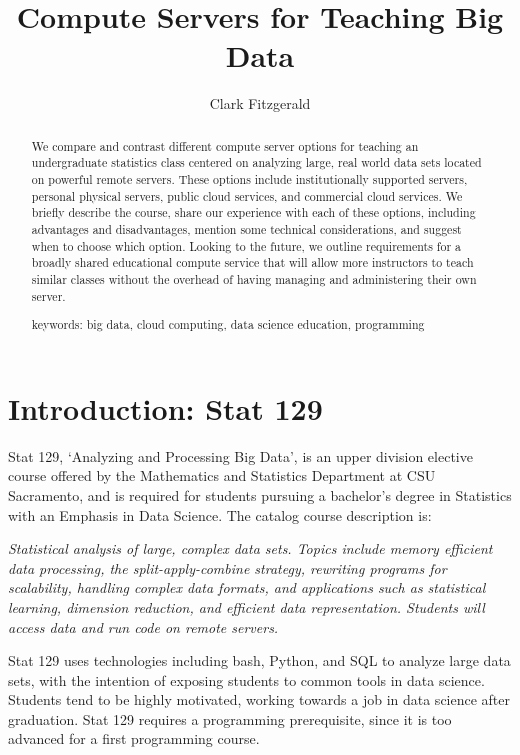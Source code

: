 \documentclass[12pt]{article}
\title{Compute Servers for Teaching Big Data}
\author{Clark Fitzgerald}
\begin{document}
\maketitle

\begin{abstract}

    We compare and contrast different compute server options for teaching an undergraduate statistics class centered on analyzing large, real world data sets located on powerful remote servers.
These options include institutionally supported servers, personal physical servers, public cloud services, and commercial cloud services.
We briefly describe the course, share our experience with each of these options, including advantages and disadvantages, mention some technical considerations, and suggest when to choose which option.
Looking to the future, we outline requirements for a broadly shared educational compute service that will allow more instructors to teach similar classes without the overhead of having managing and administering their own server.

keywords: big data, cloud computing, data science education, programming

\end{abstract}



\section{Introduction: Stat 129}

Stat 129, `Analyzing and Processing Big Data', is an upper division elective course offered by the Mathematics and Statistics Department at CSU Sacramento, and is required for students pursuing a bachelor's degree in Statistics with an Emphasis in Data Science.
The catalog course description is:

\emph{
Statistical analysis of large, complex data sets. Topics include memory efficient data processing, the split-apply-combine strategy, rewriting programs for scalability, handling complex data formats, and applications such as statistical learning, dimension reduction, and efficient data representation. Students will access data and run code on remote servers.
}

Stat 129 uses technologies including bash, Python, and SQL to analyze large data sets, with the intention of exposing students to common tools in data science.
Students tend to be highly motivated, working towards a job in data science after graduation.
Stat 129 requires a programming prerequisite, since it is too advanced for a first programming course.
\end{document}
